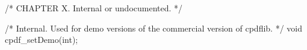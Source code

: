 /* CHAPTER X. Internal or undocumented. */

/* Internal. Used for demo versions of the commercial version of cpdflib. */
void cpdf_setDemo(int);
